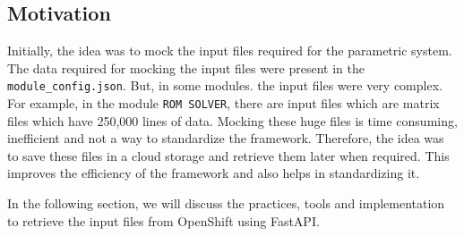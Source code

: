\subsection{Motivation}
Initially, the idea was to mock the input files required for the parametric system. The data required for mocking the input files were present in the 
\texttt{module\_config.json}. But, in some modules. the input files were very complex. For example, in the module \texttt{ROM SOLVER}, there are input files which are 
matrix files which have 250,000 lines of data. Mocking these huge files is time consuming, inefficient and not a way to standardize the framework. Therefore,
the idea was to save these files in a cloud storage and retrieve them later when required. This improves the efficiency of the framework and also helps in
standardizing it. 

In the following section, we will discuss the practices, tools and implementation to retrieve the input files from OpenShift using FastAPI.
